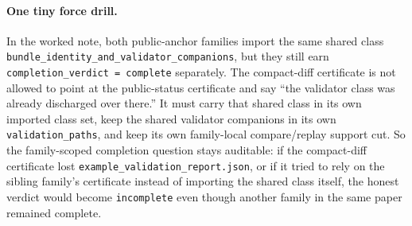 \documentclass[11pt]{article}
\begin{document}
\paragraph{One tiny force drill.}
In the worked note, both public-anchor families import the same shared class \texttt{bundle\_identity\_and\_validator\_companions}, but they still earn \texttt{completion\_verdict = complete} separately. The compact-diff certificate is not allowed to point at the public-status certificate and say ``the validator class was already discharged over there.'' It must carry that shared class in its own imported class set, keep the shared validator companions in its own \texttt{validation\_paths}, and keep its own family-local compare/replay support cut. So the family-scoped completion question stays auditable: if the compact-diff certificate lost \texttt{example\_validation\_report.json}, or if it tried to rely on the sibling family's certificate instead of importing the shared class itself, the honest verdict would become \texttt{incomplete} even though another family in the same paper remained complete.\cite{series:workedexample}
\end{document}
